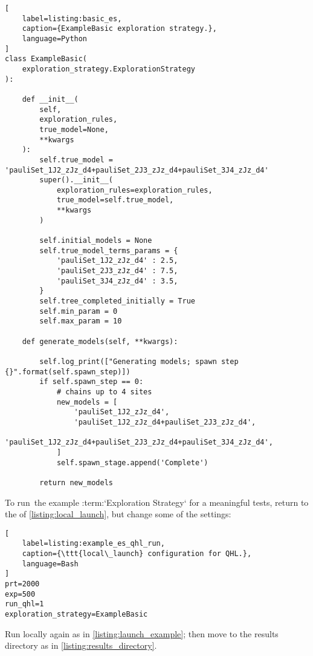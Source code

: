 \begin{lstlisting}[
    label=listing:basic_es,
    caption={ExampleBasic exploration strategy.},
    language=Python
]
class ExampleBasic(
    exploration_strategy.ExplorationStrategy
):

    def __init__(
        self,
        exploration_rules,
        true_model=None,
        **kwargs
    ):
        self.true_model = 'pauliSet_1J2_zJz_d4+pauliSet_2J3_zJz_d4+pauliSet_3J4_zJz_d4'
        super().__init__(
            exploration_rules=exploration_rules,
            true_model=self.true_model,
            **kwargs
        )

        self.initial_models = None
        self.true_model_terms_params = {
            'pauliSet_1J2_zJz_d4' : 2.5,
            'pauliSet_2J3_zJz_d4' : 7.5,
            'pauliSet_3J4_zJz_d4' : 3.5,
        }
        self.tree_completed_initially = True
        self.min_param = 0
        self.max_param = 10

    def generate_models(self, **kwargs):

        self.log_print(["Generating models; spawn step {}".format(self.spawn_step)])
        if self.spawn_step == 0:
            # chains up to 4 sites
            new_models = [
                'pauliSet_1J2_zJz_d4',
                'pauliSet_1J2_zJz_d4+pauliSet_2J3_zJz_d4',
                'pauliSet_1J2_zJz_d4+pauliSet_2J3_zJz_d4+pauliSet_3J4_zJz_d4',
            ]
            self.spawn_stage.append('Complete')

        return new_models

\end{lstlisting}


To run\footnotemark \ the example :term:`Exploration Strategy` for a meaningful tests, 
    return to the  of \cref{listing:local_launch}, 
    but change some of the settings:
\begin{lstlisting}[
    label=listing:example_es_qhl_run,
    caption={\ttt{local\_launch} configuration for QHL.},
    language=Bash
]
prt=2000
exp=500
run_qhl=1
exploration_strategy=ExampleBasic
\end{lstlisting}

Run locally again as in \cref{listing:launch_example};
    then move to the results directory as in \cref{listing:results_directory}. 
\par 


